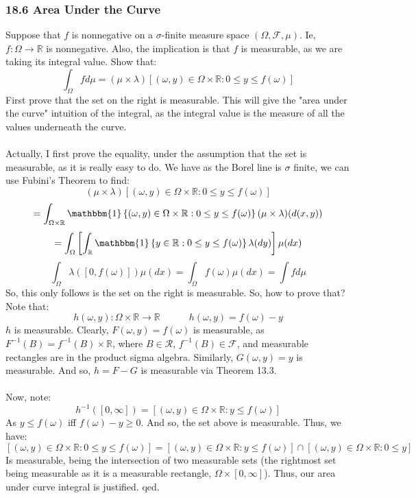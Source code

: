 \documentclass[12pt,a4paper]{article}
\newcommand{\1}[1]{\mathbbm{1}\left\{ #1 \right\}}
\newcommand{\R}{\mathbb{R}}
\newcommand{\fcal}{\mathcal{F}}
\newcommand{\rcal}{\mathcal{R}}
\begin{document}
\subsubsection{18.6 Area Under the Curve} Suppose that $f$ is nonnegative on a $\sigma$-finite measure space $(\Omega, \fcal, \mu)$. Ie, $f: \Omega \to \R$ is nonnegative. Also, the implication is that $f$ is measurable, as we are taking its integral value. Show that:
$$
	\int_\Omega f d\mu =
	(\mu \times \lambda)\left[(\omega, y) \in \Omega \times \R : 0 \leq y \leq f(\omega)\right]
$$
First prove that the set on the right is measurable. This will give the "area under the curve" intuition of the integral, as the integral value is the measure of all the values underneath the curve.
\\\\
Actually, I first prove the equality, under the assumption that the set is measurable, as it is really easy to do. We have as the Borel line is $\sigma$ finite, we can use Fubini's Theorem to find:
$$
	(\mu \times \lambda)\left[(\omega, y) \in \Omega \times \R : 0 \leq y \leq f(\omega)\right]
$$
$$
	=
	\int_{\Omega \times \R} \1{(\omega, y) \in \Omega \times \R : 0 \leq y \leq f(\omega)} (\mu \times \lambda)(d(x,y))
$$
$$
	=
	\int_\Omega \left[\int_\R \1{y \in \R : 0 \leq y \leq f(\omega)} \lambda(dy)\right] \mu(dx)
$$
$$
	\int_\Omega \lambda([0, f(\omega)]) \mu(dx) =
	\int_\Omega f(\omega) \mu(dx) =
	\int f d\mu
$$
So, this only follows is the set on the right is measurable. So, how to prove that? Note that:
$$
	h(\omega, y): \Omega \times \R \to \R
	\quad\quad\quad
	h(\omega, y) = f(\omega) - y
$$
$h$ is measurable. Clearly, $F(\omega, y) = f(\omega)$ is measurable, as $F^{-1}(B) = f^{-1}(B) \times \R$, where $B \in \rcal$, $f^{-1}(B) \in \fcal$, and measurable rectangles are in the product sigma algebra. Similarly, $G(\omega, y) = y$ is measurable. And so, $h = F - G$ is measurable via Theorem 13.3.
\\\\
Now, note:
$$
	h^{-1}([0, \infty]) = \left[(\omega, y) \in \Omega \times \R : y \leq f(\omega)\right]
$$
As $y \leq f(\omega)$ iff $f(\omega) - y \geq 0$. And so, the set above is measurable. Thus, we have:
$$
	\left[(\omega, y) \in \Omega \times \R : 0 \leq y \leq f(\omega)\right] =
	\left[(\omega, y) \in \Omega \times \R : y \leq f(\omega)\right] \cap
	\left[(\omega, y) \in \Omega \times \R : 0 \leq y\right]
$$
Is measurable, being the intersection of two measurable sets (the rightmost set being measurable as it is a measurable rectangle, $\Omega \times [0, \infty]$). Thus, our area under curve integral is justified. qed.
\end{document}

